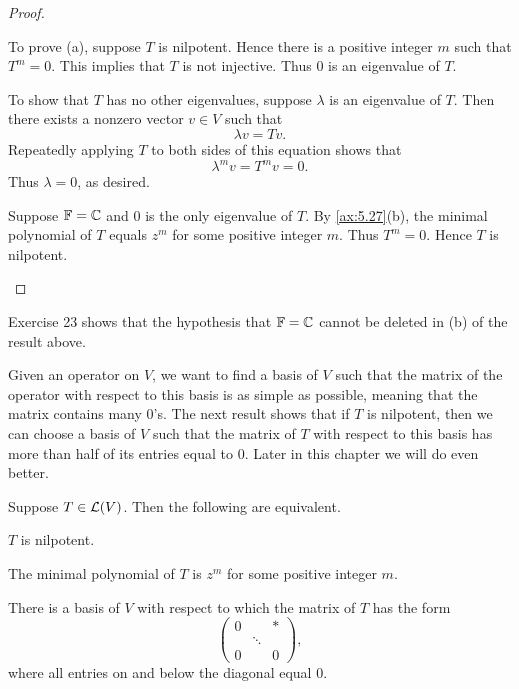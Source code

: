 \begin{proof}\leavevmode
\begin{parts}
\item To prove (a), suppose $T$ is nilpotent. Hence there is a positive integer
  $m$ such that $T^m=0$. This implies that $T$ is not injective. Thus $0$ is an
  eigenvalue of $T$.

  To show that $T$ has no other eigenvalues, suppose $\lambda$ is an eigenvalue
  of $T$. Then there exists a nonzero vector $v\in V$ such that
  \[ \lambda v = Tv. \]
  Repeatedly applying $T$ to both sides of this equation shows that
  \[ \lambda^mv = T^mv = 0. \]
  Thus $\lambda=0$, as desired.
\item Suppose $\mathbb{F}=\mathbb{C}$ and $0$ is the only eigenvalue of $T$. By
  \ref{ax:5.27}(b), the minimal polynomial of $T$ equals $z^m$ for some
  positive integer $m$. Thus $T^m=0$. Hence $T$ is nilpotent.
\end{parts}
\end{proof}

Exercise 23 shows that the hypothesis that $\mathbb{F}=\mathbb{C}$ cannot be deleted in (b) of
the result above.

Given an operator on $V$, we want to find a basis of $V$ such that the matrix
of the operator with respect to this basis is as simple as possible, meaning
that the matrix contains many $0$'s. The next result shows that if $T$ is
nilpotent, then we can choose a basis of $V$ such that the matrix of $T$ with
respect to this basis has more than half of its entries equal to $0$. Later in
this chapter we will do even better.

\begin{result}\label{ax:8.18}
Suppose $T\in\mathcal{L}(V)$. Then the following are equivalent.
\begin{parts}
\item $T$ is nilpotent.
\item The minimal polynomial of $T$ is $z^m$ for some positive integer $m$.
\item There is a basis of $V$ with respect to which the matrix of $T$ has the
  form
  \[ \begin{pmatrix} 0 & & *\\ & \ddots & \\ 0 & & 0 \end{pmatrix}, \]
  where all entries on and below the diagonal equal $0$.
\end{parts}
\end{result}

